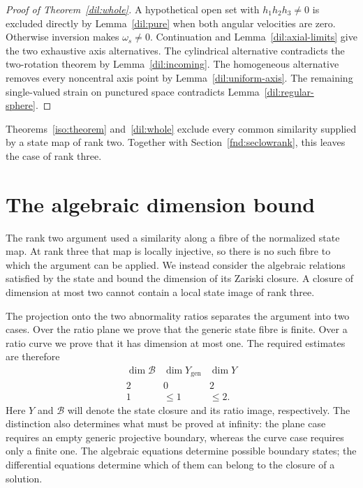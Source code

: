 \documentclass[11pt,a4paper]{article}
\numberwithin{equation}{section}
\theoremstyle{plain}
\theoremstyle{definition}
\theoremstyle{remark}
\begin{document}
\begin{proof}[Proof of Theorem~\ref{dil:whole}]
A hypothetical open set
with $h_1h_2h_3\ne0$ is excluded directly by Lemma~\ref{dil:pure}
when both angular velocities are zero.  Otherwise inversion makes
$\omega_s\ne0$.  Continuation and Lemma~\ref{dil:axial-limits} give
the two exhaustive axis alternatives.  The cylindrical alternative
contradicts the two-rotation theorem by
Lemma~\ref{dil:incoming}.  The homogeneous alternative removes every
noncentral axis point by Lemma~\ref{dil:uniform-axis}.  The remaining
single-valued strain on punctured space contradicts
Lemma~\ref{dil:regular-sphere}.
\end{proof}

Theorems~\ref{iso:theorem} and~\ref{dil:whole} exclude every
common similarity supplied by a state map of rank two. Together
with Section~\ref{fnd:seclowrank}, this leaves the case of rank three.

\section{The algebraic dimension bound}\label{sec:rankthree}

The rank two argument used a similarity along a fibre of the
normalized state map. At rank three that map is locally injective,
so there is no such fibre to which the argument can be applied.
We instead consider the algebraic relations satisfied by the state
and bound the dimension of its Zariski closure. A closure of
dimension at most two cannot contain a local state image of rank
three.

The projection onto the two abnormality ratios separates the
argument into two cases. Over the ratio plane we prove that the
generic state fibre is finite. Over a ratio curve we prove that it
has dimension at most one. The required estimates are therefore
\[
 \begin{array}{c|c|c}
 \dim\mathscr B & \dim Y_{\mathrm{gen}} & \dim Y\\ \hline
 2&0&2\\
 1&\le1&\le2.
 \end{array}
\]
Here $Y$ and $\mathscr B$ will denote the state closure and its
ratio image, respectively. The distinction also determines what
must be proved at infinity: the plane case requires an empty
generic projective boundary, whereas the curve case requires only
a finite one. The algebraic equations determine possible boundary
states; the differential equations determine which of them can
belong to the closure of a solution.
\end{document}
